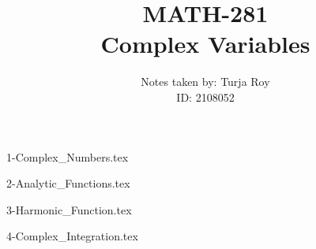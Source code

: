 \documentclass[12pt]{article}
\title{
    \textbf{MATH-281} \\
    \textbf{Complex Variables}
}
\author{
    Notes taken by: Turja Roy \\
    ID: 2108052
}
\date{}
\numberwithin{equation}{subsection}
\begin{document}
\maketitle

\tableofcontents

\newpage
{1-Complex_Numbers.tex}

\newpage
{2-Analytic_Functions.tex}

\newpage
{3-Harmonic_Function.tex}

\newpage
{4-Complex_Integration.tex}
\end{document}
